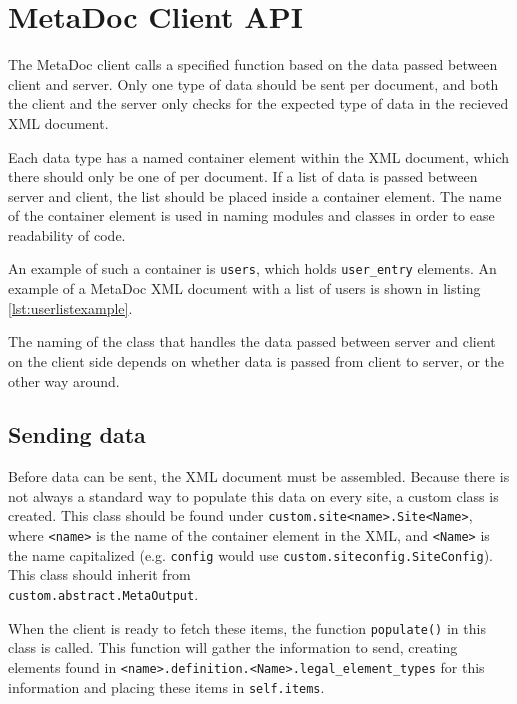 \newpage
\section{MetaDoc Client API}
\label{sec:client_api}

The MetaDoc client calls a specified function based on the data passed between
client and server. Only one type of data should be sent per document, and both
the client and the server only checks for the expected type of data in the
recieved XML document. 

Each data type has a named container element within the XML document, which
there should only be one of per document. If a list of data is passed between
server and client, the list should be placed inside a container element. The
name of the container element is used in naming modules and classes in order to
ease readability of code. 

An example of such a container is \texttt{users}, which holds
\texttt{user\_entry} elements. An example of a MetaDoc XML document with a list
of users is shown in listing \ref{lst:userlistexample}.


The naming of the class that handles the data passed between server and client
on the client side depends on whether data is passed from client to server, or
the other way around. 

\subsection{Sending data}
\label{sec:customizing_client_send}
Before data can be sent, the XML document must be assembled. Because there is
not always a standard way to populate this data on every site, a custom class
is created. This class should be found under
\texttt{custom.site<name>.Site<Name>}, where \texttt{<name>} is the name of the
container element in the XML, and \texttt{<Name>} is the name capitalized (e.g.
\texttt{config} would use \texttt{custom.siteconfig.SiteConfig}). This class
should inherit from \\ \texttt{custom.abstract.MetaOutput}. 

When the client is ready to fetch these items, the function \texttt{populate()}
in this class is called. This function will gather the information to send,
creating elements found in
\texttt{<name>.definition.<Name>.legal\_element\_types} for this information
and placing these items in \texttt{self.items}. 

